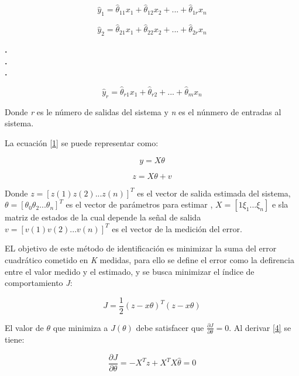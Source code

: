 \documentclass[letter,operight,12pt,spanish]{report}
\begin{document}
\begin{equation}
\hat{y}_1=\hat{\theta}_{11}x_1+\hat{\theta}_{12}x_2+...+\hat{\theta}_{1r}x_n
\end{equation}

\begin{equation}
\hat{y}_2=\hat{\theta}_{21}x_1+\hat{\theta}_{22}x_2+...+\hat{\theta}_{2r}x_n
\end{equation}

\begin{center}
\textbf{.}\\
\textbf{.}\\
\textbf{.}\\
\end{center}
\begin{equation}
\hat{y}_r=\hat{\theta}_{r1}x_1+\hat{\theta}_{r2}+...+\hat{\theta}_{m}x_n
\end{equation}

Donde \textit{r} es le n\'umero de salidas del sistema y \textit{n} es el n\'unmero de entradas al sistema.

La ecuaci\'on \ref{1} se puede representar como:

\begin{equation}
y=X\theta
\end{equation}

\begin{equation}
z=X\theta+v
\end{equation}

Donde $z=[z(1)z(2)...z(n)]^T$ es el vector de salida estimada del sistema, $\theta=[\theta_0 \theta_2...\theta_n]^T$ es el vector de par\'ametros para estimar , $X=[1 \xi_1...\xi_n]$ e sla matriz de estados de la cual depende la se\~nal de salida $v=[v(1) v(2)...v(n)]^T$ es el vector de la medici\'on del error.

EL objetivo de este m\'etodo de identificaci\'on es minimizar la suma del error cuadr\'atico cometido en \textit{K} medidas, para ello se define el error como la defirencia entre el valor medido y el estimado, y se busca minimizar el \'indice de comportamiento \textit{J}:

\begin{equation}
J=\frac{1}{2}(z-x\theta)^T(z-x\theta)
\end{equation}

El valor de $\theta$ que minimiza a $J(\theta)$ debe satisfacer que $\frac{\partial{J}}{\partial{\theta}}=0$. Al derivar \ref{4} se tiene:

\begin{equation}
\frac{\partial{J}}{\partial{\theta}}=-X^Tz+X^TX\hat{\theta}=0
\end{equation}
\end{document}
